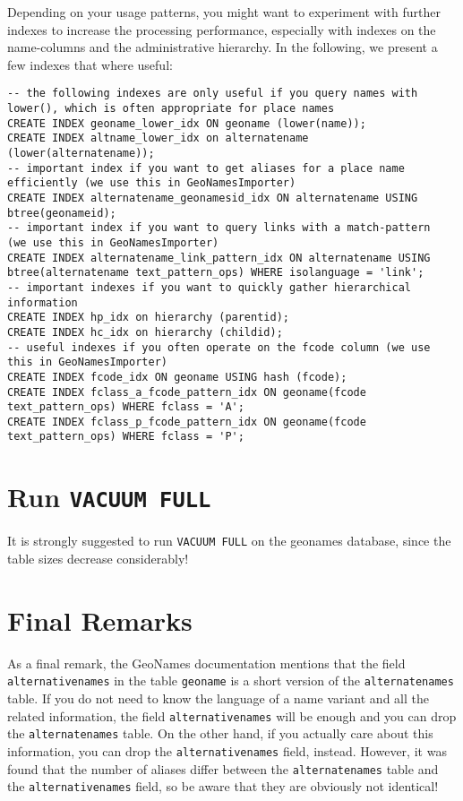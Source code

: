 \documentclass[fontsize=12pt, BCOR=10mm, DIV=14, parskip=true,headings=small]{scrartcl}
\begin{document}
Depending on your usage patterns, you might want to experiment with further indexes to increase the processing performance, especially with indexes on the name-columns and the administrative hierarchy. In the following, we present a few indexes that where useful:
\begin{lstlisting}[breaklines]
-- the following indexes are only useful if you query names with lower(), which is often appropriate for place names
CREATE INDEX geoname_lower_idx ON geoname (lower(name));
CREATE INDEX altname_lower_idx on alternatename (lower(alternatename));
-- important index if you want to get aliases for a place name efficiently (we use this in GeoNamesImporter)
CREATE INDEX alternatename_geonamesid_idx ON alternatename USING btree(geonameid);
-- important index if you want to query links with a match-pattern  (we use this in GeoNamesImporter)
CREATE INDEX alternatename_link_pattern_idx ON alternatename USING btree(alternatename text_pattern_ops) WHERE isolanguage = 'link';
-- important indexes if you want to quickly gather hierarchical information
CREATE INDEX hp_idx on hierarchy (parentid);
CREATE INDEX hc_idx on hierarchy (childid);
-- useful indexes if you often operate on the fcode column (we use this in GeoNamesImporter)
CREATE INDEX fcode_idx ON geoname USING hash (fcode);
CREATE INDEX fclass_a_fcode_pattern_idx ON geoname(fcode text_pattern_ops) WHERE fclass = 'A';
CREATE INDEX fclass_p_fcode_pattern_idx ON geoname(fcode text_pattern_ops) WHERE fclass = 'P';
\end{lstlisting}

\section{Run \texttt{VACUUM FULL}}
It is strongly suggested to run \texttt{VACUUM FULL} on the geonames database, since the table sizes decrease considerably!

\section{Final Remarks}
As a final remark, the GeoNames documentation mentions that the field \texttt{alternativenames} in the table \texttt{geoname} is a short version of the \texttt{alternatenames} table. If you do not need to know the language of a name variant and all the related information, the field \texttt{alternativenames} will be enough and you can drop the \texttt{alternatenames} table. On the other hand, if you actually care about this information, you can drop the \texttt{alternativenames} field, instead. However, it was found that the number of aliases differ between the \texttt{alternatenames} table and the \texttt{alternativenames} field, so be aware that they are obviously not identical! 
\end{document}
